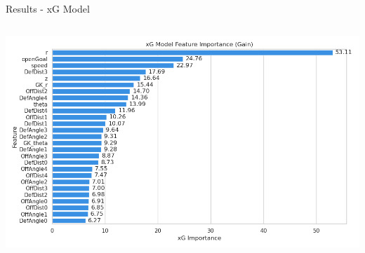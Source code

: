 \documentclass{beamer}
\begin{document}
\begin{frame}{Results - xG Model}
\begin{columns}[c]
  \includegraphics[width=\linewidth]{figures/xG_feature_importance.png}
\end{columns}
\end{frame}
\end{document}
